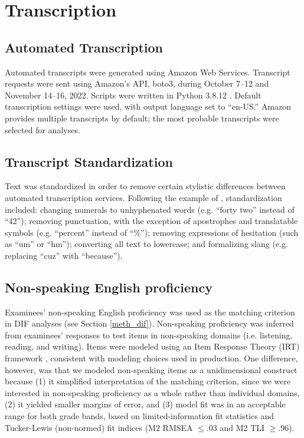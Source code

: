 \documentclass [PhD] {uclathes}
\begin{document}
\section{Transcription}

\subsection{Automated Transcription}
\label{meth_auto_transcribe}

Automated transcripts were generated using Amazon Web Services. Transcript requests were sent using Amazon’s API, boto3, during October 7–12 and November 14–16, 2022. Scripts were written in Python 3.8.12 \citep{python2022}. Default transcription settings were used, with output language set to “en-US.” Amazon provides multiple transcripts by default; the most probable transcripts were selected for analyses.

\subsection{Transcript Standardization}
\label{sec:meth_text_standardization}

Text was standardized in order to remove certain stylistic differences between automated transcription services. Following the example of \cite{koenecke2020}, standardization included: changing numerals to unhyphenated words (e.g. “forty two” instead of “42”); removing punctuation, with the exception of apostrophes and translatable symbols (e.g. “percent” instead of “\%”); removing expressions of hesitation (such as “um” or “hm”); converting all text to lowercase; and formalizing slang (e.g. replacing “cuz” with “because”).

\subsection{Non-speaking English proficiency}
\label{meth_nonspeaking}

Examinees' non-speaking English proficiency was used as the matching criterion in DIF analyses (see Section \ref {meth_dif}). Non-speaking proficiency was inferred from examinees' responses to test items in non-speaking domains (i.e. listening, reading, and writing). Items were modeled using an Item Response Theory (IRT) framework \citep{cai_item_2016}, consistent with modeling choices used in production. One difference, however, was that we modeled non-speaking items as a unidimensional construct because (1) it simplified interpretation of the matching criterion, since we were interested in non-speaking proficiency as a whole rather than individual domains, (2) it yielded smaller margins of error, and (3) model fit was in an acceptable range for both grade bands, based on limited-information fit statistics and Tucker-Lewis (non-normed) fit indices (M2 RMSEA $\leq .03$ and M2 TLI $\geq .96$). 
\end{document}
